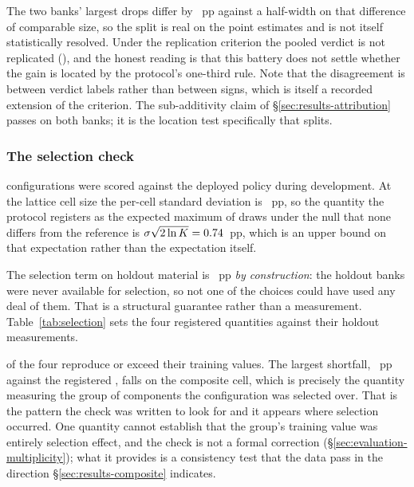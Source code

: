 The two banks' largest drops differ by \vsevenLocSplit{}~pp against a half-width on that difference of
comparable size, so the split is real on the point estimates and is not itself statistically resolved.
Under the replication criterion the pooled verdict is not replicated
(\vsevenLocReplicates{}), and the honest reading is that this battery does not settle whether the gain
is located by the protocol's one-third rule. Note that the disagreement is between verdict labels
rather than between signs, which is itself a recorded extension of the criterion. The sub-additivity
claim of \S\ref{sec:results-attribution} passes on both banks; it is the location test specifically
that splits.

\subsubsection{The selection check}
\label{sec:results-selection}

\vsevenSelK{} configurations were scored against the deployed policy during development. At the
lattice cell size the per-cell standard deviation is \vsevenSelSigma{}~pp, so the quantity the protocol registers as the expected maximum of
\vsevenSelK{} draws under the null that none differs from the reference is
$\sigma\sqrt{2\ln K} = 0.74{}$~pp, which is an upper bound on that
expectation rather than the expectation itself.

The selection term on holdout material is \vsevenSelOnHoldout{}~pp \emph{by construction}: the holdout
banks were never available for selection, so not one of the \vsevenSelK{} choices could have used any
deal of them. That is a structural guarantee rather than a measurement.
Table~\ref{tab:selection} sets the four registered quantities against their holdout measurements.

\begin{table}[!ht]\centering
\caption{The four quantities the registered selection check tabulates, against their holdout
measurements. Three reproduce or exceed; one falls short. These are not every figure the protocol
states in advance, and two of the partner-regime predictions in \S\ref{sec:results-partners} also
come in low.}
\label{tab:selection}
{\tabfont}
\end{table}

\vsevenSelReproduce{} of the four reproduce or exceed their training values. The largest shortfall,
\vsevenSelWorstShortfall{}~pp against the registered \vsevenSelExpectedMax{},
falls on the composite cell, which is precisely the quantity measuring the group of components the
configuration was selected over. That is the pattern the check was written to look for and it appears
where selection occurred. One quantity cannot establish that the group's training value was entirely
selection effect, and the check is not a formal correction
(\S\ref{sec:evaluation-multiplicity}); what it provides is a consistency test that the data pass in
the direction \S\ref{sec:results-composite} indicates.


